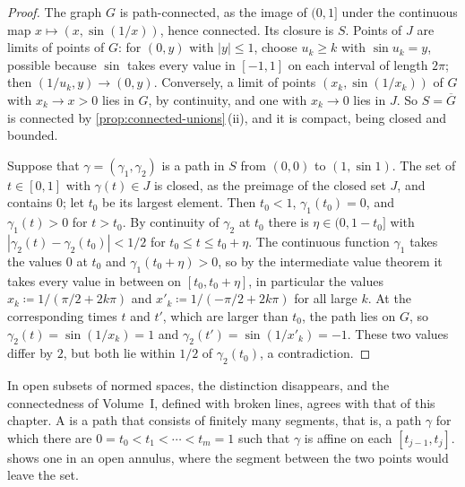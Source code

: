 \begin{proof}
The graph $G$ is path-connected, as the image of $(0,1]$ under the continuous map $x\mapsto(x,\sin(1/x))$, hence connected. Its closure is $S$. Points of $J$ are limits of points of $G$: for $(0,y)$ with $|y|\le1$, choose $u_k\ge k$ with $\sin u_k=y$, possible because $\sin$ takes every value in $[-1,1]$ on each interval of length $2\pi$; then $(1/u_k,y)\to(0,y)$. Conversely, a limit of points $(x_k,\sin(1/x_k))$ of $G$ with $x_k\to x>0$ lies in $G$, by continuity, and one with $x_k\to0$ lies in $J$. So $S=\overline G$ is connected by \cref{prop:connected-unions}\,(ii), and it is compact, being closed and bounded.

Suppose that $\gamma=(\gamma_1,\gamma_2)$ is a path in $S$ from $(0,0)$ to $(1,\sin1)$. The set of $t\in[0,1]$ with $\gamma(t)\in J$ is closed, as the preimage of the closed set $J$, and contains $0$; let $t_0$ be its largest element. Then $t_0<1$, $\gamma_1(t_0)=0$, and $\gamma_1(t)>0$ for $t>t_0$. By continuity of $\gamma_2$ at $t_0$ there is $\eta\in(0,1-t_0]$ with $|\gamma_2(t)-\gamma_2(t_0)|<1/2$ for $t_0\le t\le t_0+\eta$. The continuous function $\gamma_1$ takes the values $0$ at $t_0$ and $\gamma_1(t_0+\eta)>0$, so by the intermediate value theorem it takes every value in between on $[t_0,t_0+\eta]$, in particular the values $x_k\coloneqq1/(\pi/2+2k\pi)$ and $x'_k\coloneqq1/(-\pi/2+2k\pi)$ for all large $k$. At the corresponding times $t$ and $t'$, which are larger than $t_0$, the path lies on $G$, so $\gamma_2(t)=\sin(1/x_k)=1$ and $\gamma_2(t')=\sin(1/x'_k)=-1$. These two values differ by $2$, but both lie within $1/2$ of $\gamma_2(t_0)$, a contradiction.
\end{proof}

In open subsets of normed spaces, the distinction disappears, and the connectedness of Volume~I, defined with broken lines, agrees with that of this chapter. A  is a path that consists of finitely many segments, that is, a path $\gamma$ for which there are $0=t_0<t_1<\cdots<t_m=1$ such that $\gamma$ is affine on each $[t_{j-1},t_j]$.  shows one in an open annulus, where the segment between the two points would leave the set.

